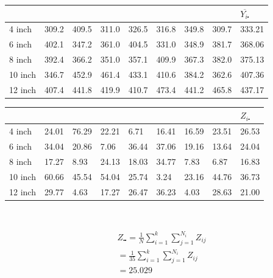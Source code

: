 \documentclass{article}
\begin{document}
\begin{table}[H]
    \begin{tabular}{|l|l|l|l|l|l|l|l|l|}
    \hline
            &       &       &       &       &       &       &       & $\overline{Y_{i\centerdot}}$ \\ \hline
    4 inch  & 309.2 & 409.5 & 311.0 & 326.5 & 316.8 & 349.8 & 309.7 & 333.21                     \\ \hline
    6 inch  & 402.1 & 347.2 & 361.0 & 404.5 & 331.0 & 348.9 & 381.7 & 368.06                     \\ \hline
    8 inch  & 392.4 & 366.2 & 351.0 & 357.1 & 409.9 & 367.3 & 382.0 & 375.13                     \\ \hline
    10 inch & 346.7 & 452.9 & 461.4 & 433.1 & 410.6 & 384.2 & 362.6 & 407.36                     \\ \hline
    12 inch & 407.4 & 441.8 & 419.9 & 410.7 & 473.4 & 441.2 & 465.8 & 437.17                     \\ \hline
    \end{tabular}
\end{table}

\begin{table}[H]
    \begin{tabular}{|l|l|l|l|l|l|l|l|l|}
    \hline
            &       &       &       &       &       &       &       & $Z_{i\centerdot}$ \\ \hline
    4 inch  & 24.01 & 76.29 & 22.21 & 6.71 & 16.41 & 16.59 & 23.51 & 26.53                     \\ \hline
    6 inch  & 34.04 & 20.86 & 7.06 & 36.44 & 37.06 & 19.16 & 13.64 & 24.04                     \\ \hline
    8 inch  & 17.27 & 8.93 & 24.13 & 18.03 & 34.77 & 7.83 & 6.87 & 16.83                    \\ \hline
    10 inch & 60.66 & 45.54 & 54.04 & 25.74 & 3.24 & 23.16 & 44.76 & 36.73                     \\ \hline
    12 inch & 29.77 & 4.63 & 17.27 & 26.47 & 36.23 & 4.03 & 28.63 & 21.00                     \\ \hline
    \end{tabular}
\end{table}

~

\begin{align*}
    &Z_{\centerdot\centerdot}=\frac{1}{N}\sum_{i=1}^{k}\sum_{j=1}^{N_i}Z_{ij}\\
    &=\frac{1}{35}\sum_{i=1}^{k}\sum_{j=1}^{N_i}Z_{ij}\\
    &=25.029\\
\end{align*}
\end{document}
